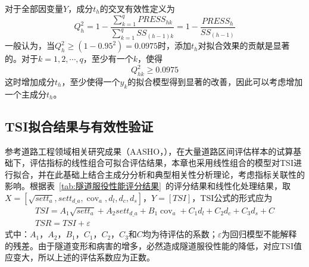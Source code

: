 对于全部因变量$Y$，成分$t_h$的交叉有效性定义为
\begin{equation}
    Q_{h}^{2}=1-\frac{\sum\limits_{k=1}^{q}{PRES{{S}_{hk}}}}{\sum\limits_{k=1}^{q}{S{{S}_{(h-1)k}}}}=1-\frac{PRES{{S}_{h}}}{S{{S}_{(h-1)}}}
\end{equation}
一般认为，当$Q_{h}^{2}\ge (1-{{0.95}^{2}})=0.0975$时，添加$t_h$对拟合效果的贡献是显著的。对于$k=1,2,\cdots ,q$，至少有一个$k$，使得
\begin{equation}
    Q_{hk}^{2}\ge 0.0975
\end{equation}
这时增加成分$t_h$，至少使得一个$y_k$的拟合模型得到显著的改善，因此可以考虑增加一个主成分$t_h$。

\subsection{TSI拟合结果与有效性验证}

参考道路工程领域相关研究成果（AASHO，\citeyear{AASHO1962the}），在大量道路区间评估样本的试算基础下，评估指标的线性组合可拟合评估结果，本章也采用线性组合的模型对TSI进行拟合，并在此基础上结合主成分分析和典型相关性分析理论，考虑指标关联性的影响。根据表~\ref{tab:隧道服役性能评分结果}~的评分结果和线性化处理结果，取$X=\left[ \sqrt{set{{t}_{a}}},set{{t}_{d\_a}},{{\operatorname{cov}}_{a}},{{d}_{l}},{{d}_{c}},{{d}_{s}} \right]$，$Y=\left[ TSI \right]$，TSI公式的形式应为
\begin{gather}
    TSI={{A}_{1}}\sqrt{set{{t}_{a}}}+{{A}_{2}}set{{t}_{d\_a}}+{{B}_{1}}{{\operatorname{cov}}_{a}}+{{C}_{1}}{{d}_{l}}+{{C}_{2}}{{d}_{c}}+{{C}_{3}}{{d}_{s}}+C \\ 
    TSR=TSI+{\varepsilon }
\end{gather}
式中：$A_1$，$A_2$，$B_1$，$C_1$，$C_2$，$C_3$和$C$均为待评估的系数；$\varepsilon $为回归模型不能解释的残差。由于隧道变形和病害的增多，必然造成隧道服役性能的降低，对应TSI值应变大，所以上述的评估系数应为正数。

